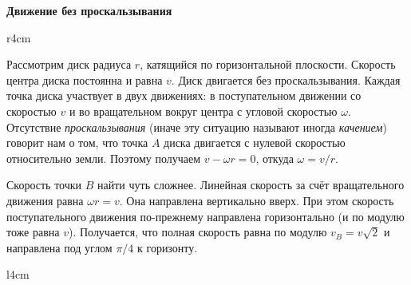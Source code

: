

\renewcommand{\libproblempath}{../../../materials/problems_db}



\setcounter{notask}{16}

\parindent=10pt

\begin{center}
  \large \textbf{Движение без проскальзывания}
\end{center}

\begin{wrapfigure}{r}{4cm}
\end{wrapfigure}

Рассмотрим диск радиуса $r$, катящийся по горизонтальной
плоскости. Скорость центра диска постоянна и равна $v$. Диск двигается
без проскальзывания. Каждая точка диска участвует в двух движениях: в
поступательном движении со скоростью $v$ и во вращательном вокруг
центра с угловой скоростью $\omega$. Отсутствие
\textit{проскальзывания} (иначе эту ситуацию называют иногда
\textit{качением}) говорит нам о том, что точка $A$ диска двигается с
нулевой скоростью относительно земли. Поэтому получаем
$v - \omega r =0$, откуда $\omega = v/r$.

Скорость точки $B$ найти чуть сложнее. Линейная скорость за счёт
вращательного движения равна $\omega r = v$. Она направлена
вертикально вверх. При этом скорость поступательного движения
по-прежнему направлена горизонтально (и по модулю тоже равна
$v$). Получается, что полная скорость равна по модулю $v_B = v\sqrt{2}$ и
направлена под углом $\pi/4$ к горизонту. 

\begin{wrapfigure}{l}{4cm}
\end{wrapfigure}

